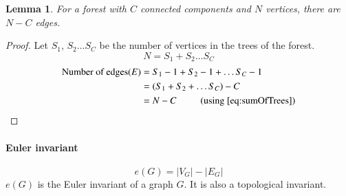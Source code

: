 \documentclass{article}
\newtheorem{lemma}{Lemma}
\begin{document}
\begin{lemma}
    For a forest with $C$ connected components and $N$ vertices, there are $N-C$ edges.
\end{lemma}
\begin{proof}
    Let $S_{1}$, $S_{2}\dots S_{C}$ be the number of vertices in the trees of the forest.\\
    \begin{equation}
        \label{eq:sumOfTrees}
        N=S_{1}+S_{2}\dots S_{C}
    \end{equation}
    \begin{align*}
        \text{Number of edges} (E) &= S_{1}-1+S_{2}-1+\dots S_{C}-1\\
        &= (S_{1}+S_{2}+\dots S_{C})-C\\
        &= N-C \phantom{xxxxx}\text{(using \ref{eq:sumOfTrees})}
    \end{align*}
\end{proof}

\paragraph{Euler invariant}

\begin{equation*}
    e(G) = |V_{G}| - |E_{G}|
\end{equation*}
$e(G)$ is the Euler invariant of a graph $G$. It is also a topological invariant.
\end{document}
